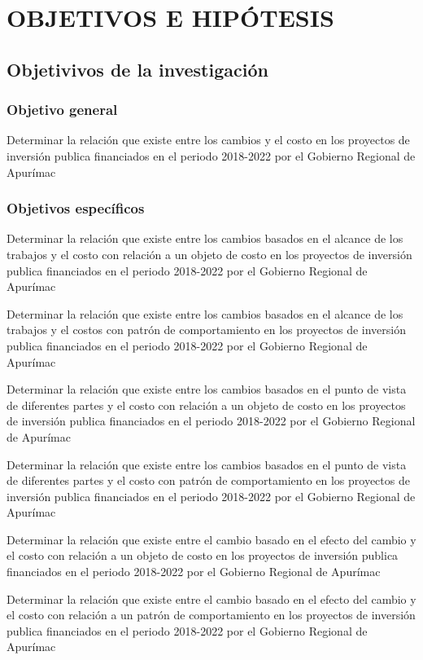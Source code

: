 \pagestyle{myheadings}
\chapter{OBJETIVOS E HIPÓTESIS}
\section{Objetivivos de la investigación}

\subsection{Objetivo general}

Determinar la relación que existe entre los cambios y el costo en los proyectos de inversión publica financiados en el periodo 2018-2022 por el Gobierno Regional de Apurímac

\subsection{Objetivos específicos}

Determinar la relación que existe entre los cambios  basados en el alcance de los trabajos y el costo con relación a un objeto de costo en los proyectos de inversión publica financiados en el periodo 2018-2022 por el Gobierno Regional de Apurímac

Determinar la relación que existe entre los cambios basados en el alcance de los trabajos y el costos con patrón de comportamiento en los proyectos de inversión publica financiados en el periodo 2018-2022 por el Gobierno Regional de Apurímac

Determinar la relación que existe entre los cambios basados en el punto de vista de diferentes partes y el costo con relación a un objeto de costo en los proyectos de inversión publica financiados en el periodo 2018-2022 por el Gobierno Regional de Apurímac

Determinar la relación que existe entre los cambios basados en el punto de vista de diferentes partes y el costo con patrón de comportamiento en los proyectos de inversión publica financiados en el periodo 2018-2022 por el Gobierno Regional de Apurímac

Determinar la relación que existe entre el cambio basado en el efecto del cambio y el costo con relación a un objeto de costo en los proyectos de inversión publica financiados en el periodo 2018-2022 por el Gobierno Regional de Apurímac

Determinar la relación que existe entre el cambio basado en el efecto del cambio y el costo con relación a un patrón de comportamiento en los proyectos de inversión publica financiados en el periodo 2018-2022 por el Gobierno Regional de Apurímac

